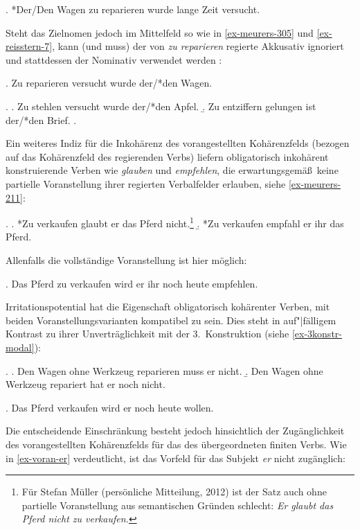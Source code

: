 \ex. *Der/Den Wagen zu reparieren wurde lange Zeit versucht. \hfill \citep[(315b)]{Meurers:99} \label{ex-meurers-315} 

Steht das Zielnomen jedoch im Mittelfeld so wie in \ref{ex-meurers-305} und \ref{ex-reisstern-7}, kann (und muss) der von {\it zu reparieren} regierte Akkusativ ignoriert und stattdessen der Nominativ verwendet werden \citep{Pollard:94}:  

\ex. Zu reparieren versucht wurde der/*den Wagen. \hfill \citep[(305)]{Meurers:99} \label{ex-meurers-305} 

\ex. \label{ex-reisstern-7}
\a. Zu stehlen versucht wurde der/*den Apfel.
\b. Zu entziffern gelungen ist der/*den Brief.
\z. \citep[(7)]{Reis:Sternefeld:04}

Ein weiteres Indiz für die Inkohärenz des vorangestellten Kohärenzfelds (bezogen auf das Kohärenzfeld des regierenden Verbs) liefern obligatorisch inkohärent konstruierende Verben wie {\it glauben} und {\it empfehlen}, die erwartungsgemä\ss\ keine partielle Voranstellung ihrer regierten Verbalfelder erlauben, siehe \ref{ex-meurers-211}: 

\ex. \label{ex-meurers-211}
\a. *Zu verkaufen glaubt er das Pferd nicht.\footnote{Für Stefan Müller (persönliche Mitteilung, 2012) ist der Satz auch ohne partielle Voranstellung aus semantischen Gründen schlecht: {\it Er glaubt das Pferd nicht zu verkaufen.}} \hfill \citep[(211)]{Meurers:99}
\b. *Zu verkaufen empfahl er ihr das Pferd. \hfill \citep[(205c)]{Meurers:99}

Allenfalls die vollständige Voranstellung ist hier möglich:

\ex. Das Pferd zu verkaufen wird er ihr noch heute empfehlen.\hfill \citep[(212c)]{Meurers:99}

Irritationspotential hat die Eigenschaft obligatorisch kohärenter Verben, mit beiden Voranstellungsvarianten kompatibel zu sein. Dies steht in auf"|fälligem Kontrast zu ihrer Unverträglichkeit mit der 3.~Konstruktion (siehe \ref{ex-3konstr-modal}): 

\ex. 
\a. Den Wagen ohne Werkzeug reparieren muss er nicht.
\b. Den Wagen ohne Werkzeug repariert hat er noch nicht.

\ex. Das Pferd verkaufen wird er noch heute wollen. \hfill \citep[(212a)]{Meurers:99}

Die entscheidende Einschränkung besteht jedoch hinsichtlich der Zugänglichkeit des vorangestellten Kohärenzfelds für das  des übergeordneten finiten Verbs. Wie in \ref{ex-voran-er} verdeutlicht, ist das Vorfeld für das Subjekt {\it er} nicht zugänglich:

